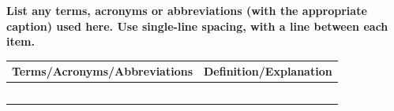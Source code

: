 \documentclass{cputthesis}
\begin{document}
\begin{cputglossary}
	\textbf{List any terms, acronyms or abbreviations (with the appropriate caption) used here. Use single-line spacing, with a line between each item.}
	
	\noindent\begin{tabularx}{0.96\textwidth}{|Y|Y|}
		\hline
		\textbf{Terms/Acronyms/Abbreviations} & \textbf{Definition/Explanation} \\
		\hline
		& \\[1.2\baselineskip]
		& \\[1.2\baselineskip]
		& \\[1.2\baselineskip]
		& \\[1.2\baselineskip]
		& \\[1.2\baselineskip]
		\hline
	\end{tabularx}
\end{cputglossary}

\cputcontents

\mainmatter






\nocite{*}
\printcputbibliography

\appendix


\end{document}

